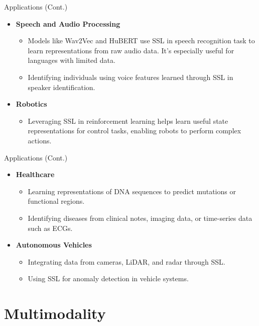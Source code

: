 \documentclass[serif, aspectratio=169]{beamer}
\begin{document}
\begin{frame}{Applications (Cont.)}
    \begin{itemize}
        \item \textbf{Speech and Audio Processing}
        \begin{itemize}
            \item Models like Wav2Vec and HuBERT use SSL in speech recognition task to learn representations from raw audio data. It's especially useful for languages with limited data.
            \item Identifying individuals using voice features learned through SSL in speaker identification.
        \end{itemize}

        \item \textbf{Robotics}
        \begin{itemize}
            \item Leveraging SSL in reinforcement learning helps learn useful state representations for control tasks, enabling robots to perform complex actions.
        \end{itemize}
    \end{itemize}
\end{frame}


\begin{frame}{Applications (Cont.)}
    \begin{itemize}
        \item \textbf{Healthcare}
        \begin{itemize}
            \item Learning representations of DNA sequences to predict mutations or functional regions.
            \item Identifying diseases from clinical notes, imaging data, or time-series data such as ECGs.
        \end{itemize}

        \item \textbf{Autonomous Vehicles}
        \begin{itemize}
            \item Integrating data from cameras, LiDAR, and radar through SSL.
            \item Using SSL for anomaly detection in vehicle systems.
        \end{itemize}
    \end{itemize}
\end{frame}


\section{Multimodality}
\end{document}
